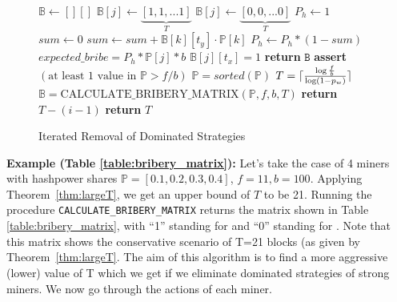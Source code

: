 \begin{figure}[H]
\centering
\caption{Iterated Removal of Dominated Strategies}\label{algorithm_1}
\label{bribing:algorithm}
\begin{algorithmic}[1]
    \State $\mathbb{B} \gets [][]$ 
            \State $\mathbb{B}[j] \gets \underbrace{[1, 1, ... 1]}_{T}$
        \Else
            \State $\mathbb{B}[j] \gets \underbrace{[0, 0, ... 0]}_{T}$
                \State $P_h \gets 1$
                    \State $sum \gets 0$
                        \State $sum \gets sum + \mathbb{B}[k][t_y] \cdot \mathbb{P}[k]$
                    \EndFor
                    \State $P_h \gets P_h * (1 - sum)$
                \EndFor
                \State $expected\_bribe = P_h * \mathbb{P}[j] * b$
                    \State $\mathbb{B}[j][t_x] = 1$
                \EndIf
            \EndFor
        \EndIf
    \EndFor
    \State \textbf{return} $\mathtt{B}$
\EndProcedure
\break
{} 
    \State \textbf{assert}$(\text{at least 1 value in }\mathbb{P} > f/b)$
    \State $\mathbb{P} = sorted(\mathbb{P})$ 
    \State $T = \lceil\frac{\log \frac{f}{b}}{\log (1-p_w)}\rceil$ 
    \State $\mathbb{B} = \text{CALCULATE\_BRIBERY\_MATRIX}(\mathbb{P}, f, b, T)$
                \State \textbf{return} $T - (i - 1)$
            \EndIf
        \EndFor
    \EndFor
    \State \textbf{return} $T$
\EndProcedure
\end{algorithmic}
\end{figure}


\textbf{Example (Table \ref{table:bribery_matrix}):}
Let's take the case of 4 miners with hashpower shares $\mathbb{P} = [0.1, 0.2, 0.3, 0.4]$, $f = 11, b = 100$. Applying Theorem~\ref{thm:largeT}, we get an upper bound of $T$ to be 21. Running the procedure \texttt{CALCULATE\_BRIBERY\_MATRIX} returns the matrix shown in Table \ref{table:bribery_matrix}, with ``1'' standing for  and ``0'' standing for \follow{}. Note that this matrix shows the conservative scenario of T=21 blocks (as given by Theorem~\ref{thm:largeT}. The aim of this algorithm is to find a more aggressive (lower) value of T which we get if we eliminate dominated strategies of strong miners. We now go through the actions of each miner.


